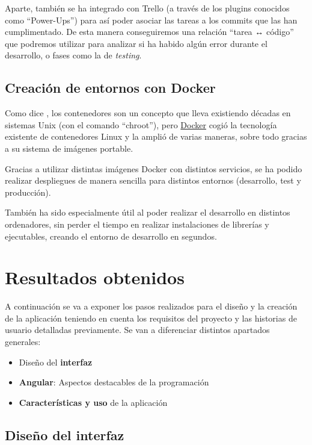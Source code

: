 \documentclass{\ClassPath/viu-tfm-template}
\begin{document}
Aparte, también se ha integrado con Trello (a través de los plugins conocidos como “Power-Ups”) para así poder asociar las tareas a los commits que las han cumplimentado. De esta manera conseguiremos una relación “tarea ↔ código” que podremos utilizar para analizar si ha habido algún error durante el desarrollo, o fases como la de \textit{testing}.


\section{Creación de entornos con Docker}
Como dice \textcite{mouat}, los contenedores son un concepto que lleva existiendo décadas en sistemas Unix (con el comando “chroot”), pero \href{https://es.wikipedia.org/wiki/Docker_(software)}{Docker} cogió la tecnología existente de contenedores Linux y la amplió de varias maneras, sobre todo gracias a su sistema de imágenes portable.

Gracias a utilizar distintas imágenes Docker con distintos servicios, se ha podido realizar despliegues de manera sencilla para distintos entornos (desarrollo, test y producción).

También ha sido especialmente útil al poder realizar el desarrollo en distintos ordenadores, sin perder el tiempo en realizar instalaciones de librerías y ejecutables, creando el entorno de desarrollo en segundos.



\chapter{Resultados obtenidos}

A continuación se va a exponer los pasos realizados para el diseño y la creación de la aplicación teniendo en cuenta los requisitos del proyecto y las historias de usuario detalladas previamente. Se van a diferenciar distintos apartados generales:

\begin{itemize}
    \item Diseño del \textbf{interfaz}
    \item \textbf{Angular}: Aspectos destacables de la programación
    \item \textbf{Características y uso} de la aplicación
\end{itemize}



\section{Diseño del interfaz}
\end{document}
